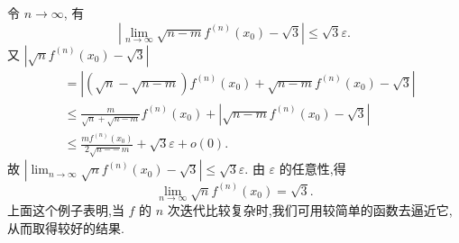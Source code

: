 令 $n \rightarrow \infty$, 有
$$
\left|\lim _{n \rightarrow \infty} \sqrt{n-m} f^{(n)}\left(x_0\right)-\sqrt{3}\right| \leqslant \sqrt{3} \varepsilon .
$$
又 $\left|\sqrt{n} f^{(n)}\left(x_0\right)-\sqrt{3}\right|$
$$
\begin{aligned}
& =\left|(\sqrt{n}-\sqrt{n-m}) f^{(n)}\left(x_0\right)+\sqrt{n-m} f^{(n)}\left(x_0\right)-\sqrt{3}\right| \\
& \leqslant \frac{m}{\sqrt{n}+\sqrt{n-m}} f^{(n)}\left(x_0\right)+\left|\sqrt{n-m} f^{(n)}\left(x_0\right)-\sqrt{3}\right| \\
& \leqslant \frac{m f^{(n)}\left(x_0\right)}{2 \sqrt{n--} m}+\sqrt{3} \varepsilon+o(0) .
\end{aligned}
$$
故 $\left|\lim _{n \rightarrow \infty} \sqrt{n} f^{(n)}\left(x_0\right)-\sqrt{3}\right| \leqslant \sqrt{3} \varepsilon$.
由 $\varepsilon$ 的任意性,得
$$
\lim _{n \rightarrow \infty} \sqrt{n} f^{(n)}\left(x_0\right)=\sqrt{3} .
$$
上面这个例子表明,当 $f$ 的 $n$ 次迭代比较复杂时,我们可用较简单的函数去逼近它, 从而取得较好的结果.


